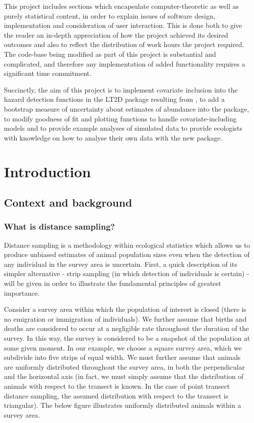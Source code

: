 \documentclass[11pt]{article}
\begin{document}
\begin{multicols}{2}
This project includes sections which encapsulate computer-theoretic as well as purely statistical content, in order to explain issues of software design, implementation and consideration of user interaction. This is done both to give the reader an in-depth appreciation of how the project achieved its desired outcomes and also to reflect the distribution of work hours the project required. The code-base being modified as part of this project is substantial and complicated, and therefore any implementation of added functionality requires a significant time commitment.

Succinctly, the aim of this project is to implement covariate inclusion into the hazard detection functions in the LT2D package resulting from \cite{Borchers}, to add a bootstrap measure of uncertainty about estimates of abundance into the package, to modify goodness of fit and plotting functions to handle covariate-including models and to provide example analyses of simulated data to provide ecologists with knowledge on how to analyse their own data with the new package.

\section{Introduction}
\subsection{Context and background}


\subsubsection{What is distance sampling?}

Distance sampling is a methodology within ecological statistics which allows us to produce unbiased estimates of animal population sizes even when the detection of any individual in the survey area is uncertain. First, a quick description of its simpler alternative - strip sampling (in which detection of individuals is certain) - will be given in order to illustrate the fundamental principles of greatest importance. 

Consider a survey area within which the population of interest is closed (there is no emigration or immigration of individuals). We further assume that births and deaths are considered to occur at a negligible rate throughout the duration of the survey. In this way, the survey is considered to be a snapshot of the population at some given moment. In our example, we choose a square survey area, which we subdivide into five strips of equal width. We must further assume that animals are uniformly distributed throughout the survey area, in both the perpendicular and the horizontal axis (in fact, we must simply assume that the distribution of animals with respect to the transect is known. In the case of point transect distance sampling, the assumed distribution with respect to the transect is triangular). The below figure illustrates uniformly distributed animals within a survey area.


\end{multicols}
\end{document}
